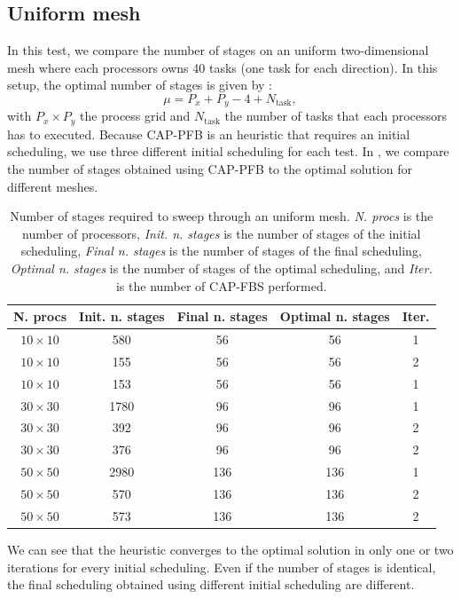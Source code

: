 \documentclass[letterpaper]{article}
\renewcommand{\(}{\left(}
\renewcommand{\)}{\right)}
\renewcommand{\[}{\left[}
\renewcommand{\]}{\right]}
\begin{document}
\subsection{Uniform mesh}
In this test, we compare the number of stages on an uniform two-dimensional mesh 
where each processors owns 40 tasks (one task for each direction). In this
setup, the optimal number of stages is given by \cite{Adams2013}:
\begin{equation}
  \mu = P_x + P_y - 4 + N_{\textrm{task}},
\end{equation}
with $P_x \times P_y$ the process grid and $N_{\textrm{task}}$ the number of
tasks that each processors has to executed. Because CAP-PFB
is an heuristic that requires an initial scheduling, we use three different
initial scheduling for each test. In , we compare the number of
stages obtained using CAP-PFB to the optimal solution for different meshes.
\begin{table}[H]
  \begin{center}
    \begin{tabular}{|c|c|c|c|c|}
      \hline
      N. procs & Init. n. stages & Final n. stages & Optimal n. stages & Iter. \\
      \hline
      $10\times 10$ &  580 &  56 &  56 & 1 \\
      $10\times 10$ &  155 &  56 &  56 & 2 \\
      $10\times 10$ &  153 &  56 &  56 & 1 \\
      $30\times 30$ & 1780 &  96 &  96 & 1 \\
      $30\times 30$ &  392 &  96 &  96 & 2 \\
      $30\times 30$ &  376 &  96 &  96 & 2 \\
      $50\times 50$ & 2980 & 136 & 136 & 1 \\
      $50\times 50$ &  570 & 136 & 136 & 2 \\ 
      $50\times 50$ &  573 & 136 & 136 & 2 \\
      \hline
    \end{tabular}
    \caption{Number of stages required to sweep through an uniform mesh.
      \emph{N. procs} is the number of processors, \emph{Init. n. stages} is the
      number of stages of the initial scheduling, \emph{Final n. stages} is the
      number of stages of the final scheduling, \emph{Optimal n. stages} is the
      number of stages of the optimal scheduling, and \emph{Iter.} is the number
    of CAP-FBS performed.}
    \label{uniform}
  \end{center}
\end{table}
We can see that the heuristic converges to the optimal solution in only one or
two iterations for every initial scheduling. Even if the number of stages is
identical, the final scheduling obtained using different initial scheduling are
different.
\end{document}
